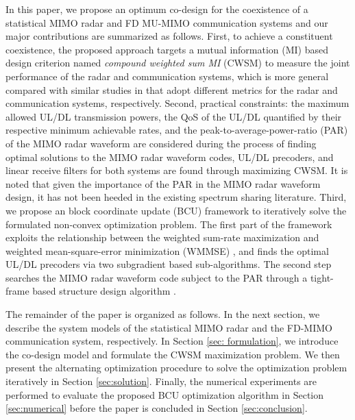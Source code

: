 \documentclass[9pt,journal]{IEEEtran}
\begin{document}
In this paper, we propose an optimum co-design for the coexistence of a statistical MIMO radar and FD MU-MIMO communication systems and our major contributions are summarized as follows. First, to achieve a constituent coexistence, the proposed approach targets a mutual information (MI) based design criterion named \textit{compound weighted sum MI} (CWSM) to measure the joint performance of the radar and communication systems, which is more general compared with similar studies in \cite{biswas2018fdqos,singh2018transceiver,he2019performance} that adopt different metrics for the radar and communication systems, respectively. Second, practical constraints: the maximum allowed UL/DL transmission powers, the QoS of the UL/DL quantified by their respective minimum achievable rates, and the peak-to-average-power-ratio (PAR) of the MIMO radar waveform are considered during the process of finding optimal solutions to the MIMO radar waveform codes, UL/DL precoders, and linear receive filters for both systems are found through maximizing CWSM. It is noted that given the importance of the PAR in the MIMO radar waveform design, it has not been heeded in the existing spectrum sharing literature. Third, we propose an block coordinate update (BCU) framework to iteratively solve the formulated non-convex optimization problem. The first part of the framework exploits the relationship between the weighted sum-rate maximization and weighted mean-square-error minimization (WMMSE) \cite{WMMSEWSR,FD_WMMSE}, and finds the optimal UL/DL precoders via two subgradient based sub-algorithms. The second step searches the MIMO radar waveform code subject to the PAR through a tight-frame based structure design algorithm \cite{nearestvector}. 

The remainder of the paper is organized as follows. In the next section, we describe the system models of the statistical MIMO radar and the FD-MIMO communication system, respectively. In Section \ref{sec: formulation}, we introduce the co-design model and formulate the CWSM maximization problem. We then present the alternating optimization procedure to solve the optimization problem iteratively in Section \ref{sec:solution}. Finally, the numerical experiments are performed to evaluate the proposed BCU optimization algorithm in Section \ref{sec:numerical} before the paper is concluded in Section \ref{sec:conclusion}.
\vspace{-1em}
\end{document}
